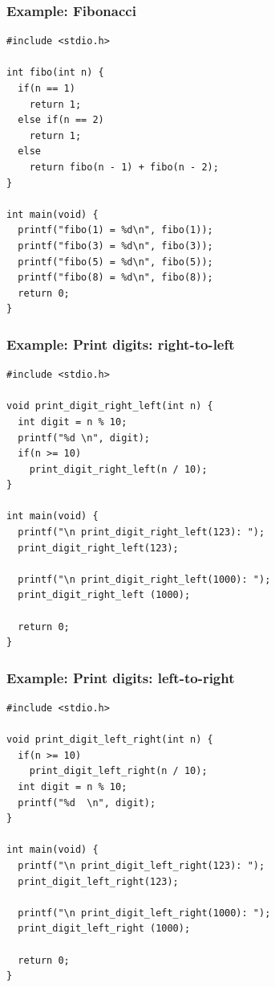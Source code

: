 \documentclass{../c-lecture}
\begin{document}
\begin{frame}[fragile]
  \frametitle{Example: Fibonacci}
  \scriptsize
  \begin{verbatim}
#include <stdio.h>

int fibo(int n) {
  if(n == 1)
    return 1;
  else if(n == 2)
    return 1;
  else
    return fibo(n - 1) + fibo(n - 2);
}

int main(void) {
  printf("fibo(1) = %d\n", fibo(1));
  printf("fibo(3) = %d\n", fibo(3));
  printf("fibo(5) = %d\n", fibo(5));
  printf("fibo(8) = %d\n", fibo(8));
  return 0;
}
  \end{verbatim}
\end{frame}

\begin{frame}[fragile]
  \frametitle{Example: Print digits: right-to-left}
  \scriptsize
  \begin{verbatim}
#include <stdio.h>

void print_digit_right_left(int n) {
  int digit = n % 10;
  printf("%d \n", digit);
  if(n >= 10)
    print_digit_right_left(n / 10);
}

int main(void) {
  printf("\n print_digit_right_left(123): ");
  print_digit_right_left(123);

  printf("\n print_digit_right_left(1000): ");
  print_digit_right_left (1000);

  return 0;
}
  \end{verbatim}
\end{frame}

\begin{frame}[fragile]
  \frametitle{Example: Print digits: left-to-right}
  \scriptsize
  \begin{verbatim}
#include <stdio.h>

void print_digit_left_right(int n) {
  if(n >= 10)
    print_digit_left_right(n / 10);
  int digit = n % 10;
  printf("%d  \n", digit);
}

int main(void) {
  printf("\n print_digit_left_right(123): ");
  print_digit_left_right(123);

  printf("\n print_digit_left_right(1000): ");
  print_digit_left_right (1000);

  return 0;
}
  \end{verbatim}
\end{frame}
\end{document}
